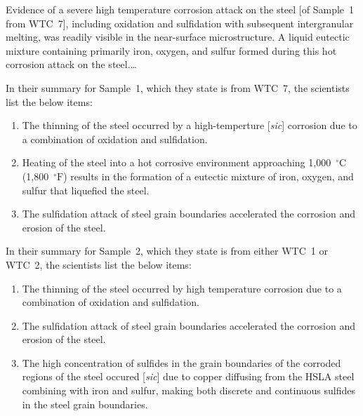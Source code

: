 \documentclass[letterpaper,12pt]{article}
\newenvironment{squote}
  {\small\quote}
  {\endquote\normalsize}
\begin{document}
\begin{squote}
Evidence of a severe high temperature corrosion attack on the steel [of Sample~1 from WTC~7], including oxidation and sulfidation with subsequent intergranular melting, was readily visible in the near-surface microstructure. A liquid eutectic mixture containing primarily iron, oxygen, and sulfur formed during this hot corrosion attack on the steel.\thinspace\ldots
\end{squote}

In their summary for Sample~1, which they state is from WTC~7, the scientists list the below items:

\begin{squote}
\begin{enumerate}
\item The thinning of the steel occurred by a high-temperture [\emph{sic}] corrosion due to a combination of oxidation and sulfidation.

\item Heating of the steel into a hot corrosive environment approaching 1,000~\( ^{\circ}\text{C} \) (1,800~\( ^{\circ}\text{F} \)) results in the formation of a eutectic mixture of iron, oxygen, and sulfur that liquefied the steel.

\item The sulfidation attack of steel grain boundaries accelerated the corrosion and erosion of the steel.
\end{enumerate}
\end{squote}

In their summary for Sample~2, which they state is from either WTC~1 or WTC~2, the scientists list the below items:

\begin{squote}
\begin{enumerate}
\item The thinning of the steel occurred by high temperature corrosion due to a combination of oxidation and sulfidation.

\item The sulfidation attack of steel grain boundaries accelerated the corrosion and erosion of the steel.

\item The high concentration of sulfides in the grain boundaries of the corroded regions of the steel occured [\emph{sic}] due to copper diffusing from the HSLA steel combining with iron and sulfur, making both discrete and continuous sulfides in the steel grain boundaries.
\end{enumerate}
\end{squote}
\end{document}
